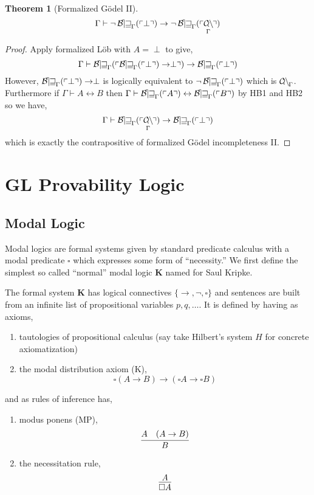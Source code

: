 \documentclass[12pt, leqno]{article}
\newcommand{\proves}{\vdash}
\newenvironment{definition}[1][Definition:]{\begin{trivlist}
\item[\hskip \labelsep {\bfseries #1}]}{\end{trivlist}}
\theoremstyle{theorem}
\newtheorem{theorem}{Theorem}[section]
\theoremstyle{definition}
\theoremstyle{definition}
\theoremstyle{remark}
\theoremstyle{definition}
\theoremstyle{remark}
\DeclareMathOperator{\Con}{\mathcal{C\mkern-3mu o\mkern-1mu n\mkern-1.5mu}}
\begin{document}
\begin{theorem}[Formalized G\"{o}del II]
\[ \Gamma \proves \neg \Thm{\perp} \to \neg \Thm{\Con_{\Gamma}} \]
\end{theorem}

\begin{proof}
Apply formalized L\"{o}b with $A = \perp$ to give,
\[ \Gamma \proves \Thm{\Thm{\perp} \to \perp} \to \Thm{\perp} \]
However, $\operatorname{\mathcal{B\mkern-2.0mu e\mkern-2.0mu w\mkern-1mu}}_{\Gamma}(\left\ulcorner \perp \right\urcorner) \to \perp$ is logically equivalent to $\neg \operatorname{\mathcal{B\mkern-2.0mu e\mkern-2.0mu w\mkern-1mu}}_{\Gamma}(\left\ulcorner \perp \right\urcorner)$ which is $\Con_{\Gamma}$. Furthermore if $\Gamma \proves A \leftrightarrow B$ then $\Gamma \proves \Thm{A} \leftrightarrow \Thm{B}$ by HB1 and HB2 so we have,
\[ \Gamma \proves \Thm{\Con_{\Gamma}} \to \Thm{\perp} \]
which is exactly the contrapositive of formalized G\"{o}del incompleteness II. 
\end{proof}



\section{GL Provability Logic}

\newcommand{\K}{\mathbf{K}}
\newcommand{\GL}{\mathbf{GL}}
\newcommand{\PA}{\mathbf{PA}}

\subsection{Modal Logic}

Modal logics are formal systems given by standard predicate calculus with a modal predicate $\square$ which expresses some form of ``necessity.'' We first define the simplest so called ``normal'' modal logic $\K$ named for Saul Kripke.

\begin{definition}
The formal system $\K$ has logical connectives $\{ \to, \neg, \square \}$ and sentences are built from an infinite list of propositional variables $p, q, \dots$. It is defined by having as axioms,
\begin{enumerate}
\item tautologies of propositional calculus (say take Hilbert's system $H$ for concrete axiomatization) 
\item the modal distribution axiom (K),
\[ \square (A \to B) \to (\square A \to \square B) \]
\end{enumerate}
and as rules of inference has,
\begin{enumerate}
\item modus ponens (MP),
\[ \infer{B}{A & (A \rightarrow B)} \]
\item the necessitation rule,
\[ \infer{\square A}{A} \]
\end{enumerate}
\end{definition}
\end{document}
